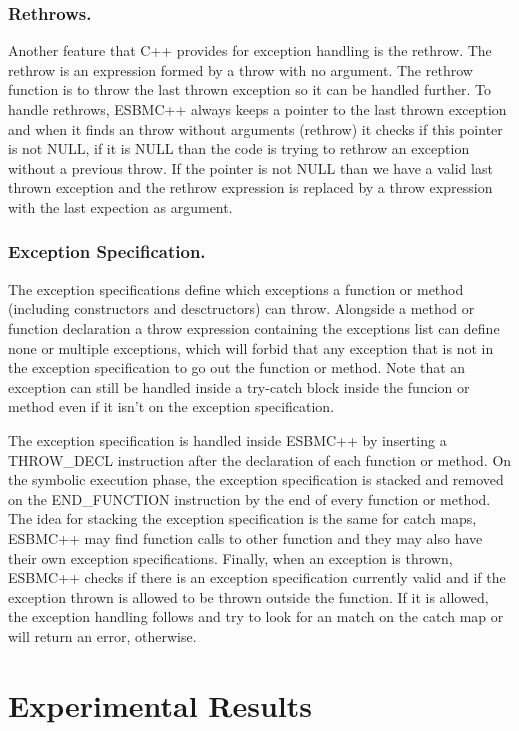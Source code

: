\documentclass[a4paper]{llncs}
\begin{document}
\subsubsection{Rethrows.} Another feature that C++ provides for exception handling is the rethrow. The rethrow is an expression formed by
a throw with no argument. The rethrow function is to throw the last thrown exception so it can be handled further. To handle rethrows, 
ESBMC++ always keeps a pointer to the last thrown exception and when it finds an throw without arguments (rethrow) it checks if this pointer
is not NULL, if it is NULL than the code is trying to rethrow an exception without a previous throw. If the pointer is not NULL than we have
a valid last thrown exception and the rethrow expression is replaced by a throw expression with the last expection as argument.

\subsubsection{Exception Specification.} The exception specifications define which exceptions a function or method (including constructors
and desctructors) can throw. Alongside a method or function declaration a throw expression containing the exceptions list can define none or
multiple exceptions, which will forbid that any exception that is not in the exception specification to go out the function or method. Note 
that an exception can still be handled inside a try-catch block inside the funcion or method even if it isn't on the exception specification.

The exception specification is handled inside ESBMC++ by inserting a THROW\_DECL instruction after the declaration of each function or method.
On the symbolic execution phase, the exception specification is stacked and removed on the END\_FUNCTION instruction by the end of every 
function or method. The idea for stacking the exception specification is the same for catch maps, ESBMC++ may find function calls to other
function and they may also have their own exception specifications. Finally, when an exception is thrown, ESBMC++ checks if there is an
exception specification currently valid and if the exception thrown is allowed to be thrown outside the function. If it is allowed, the 
exception handling follows and try to look for an match on the catch map or will return an error, otherwise.

\section{Experimental Results}
\end{document}
